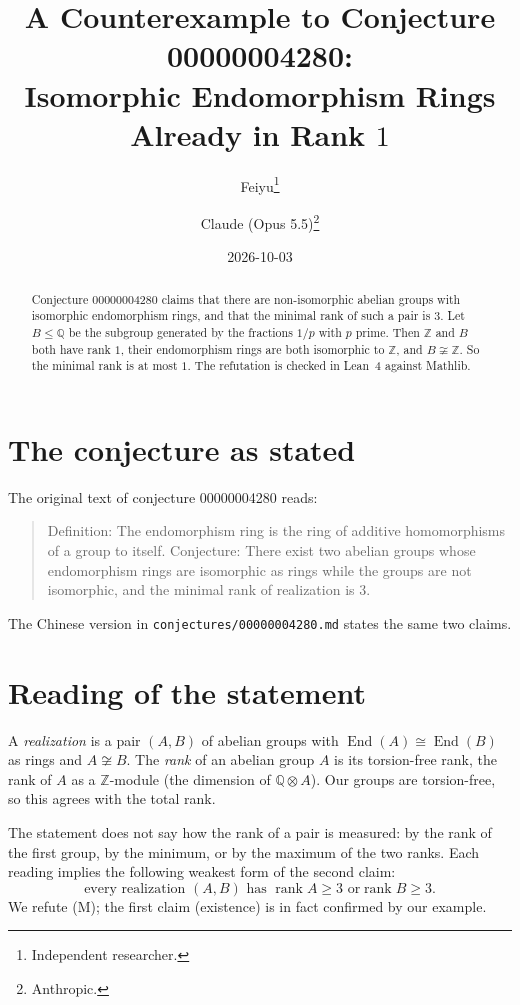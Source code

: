 \documentclass[11pt]{article}
\title{A Counterexample to Conjecture 00000004280:\\
Isomorphic Endomorphism Rings Already in Rank $1$}
\author{%
  Feiyu\thanks{Independent researcher.}
  \and
  Claude (Opus 5.5)\thanks{Anthropic.}%
}
\date{2026-10-03}
\theoremstyle{plain}
\theoremstyle{definition}
\theoremstyle{remark}
\newcommand{\Z}{\mathbb Z}
\newcommand{\Q}{\mathbb Q}
\newcommand{\End}{\operatorname{End}}
\begin{document}
\maketitle

\begin{abstract}
Conjecture 00000004280 claims that there are non-isomorphic abelian groups with
isomorphic endomorphism rings, and that the minimal rank of such a pair is $3$. Let
$B\le\Q$ be the subgroup generated by the fractions $1/p$ with $p$ prime. Then $\Z$ and
$B$ both have rank $1$, their endomorphism rings are both isomorphic to $\Z$, and
$B\not\cong\Z$. So the minimal rank is at most $1$. The refutation is checked in
Lean~4 against Mathlib.
\end{abstract}

\section{The conjecture as stated}

The original text of conjecture 00000004280 reads:

\begin{quote}
Definition: The endomorphism ring is the ring of additive homomorphisms of a group to
itself. Conjecture: There exist two abelian groups whose endomorphism rings are
isomorphic as rings while the groups are not isomorphic, and the minimal rank of
realization is $3$.
\end{quote}

The Chinese version in \texttt{conjectures/00000004280.md} states the same two
claims.

\section{Reading of the statement}

A \emph{realization} is a pair $(A,B)$ of abelian groups with $\End(A)\cong\End(B)$ as
rings and $A\not\cong B$. The \emph{rank} of an abelian group $A$ is its torsion-free
rank, the rank of $A$ as a $\Z$-module (the dimension of $\Q\otimes A$). Our groups are
torsion-free, so this agrees with the total rank.

The statement does not say how the rank of a pair is measured: by the rank of the
first group, by the minimum, or by the maximum of the two ranks. Each reading implies
the following weakest form of the second claim:
\begin{equation}\label{eq:M}
\text{every realization $(A,B)$ has $\operatorname{rank}A\ge3$ or
$\operatorname{rank}B\ge3$.}\tag{M}
\end{equation}
We refute (M); the first claim (existence) is in fact confirmed by our example.
\end{document}
